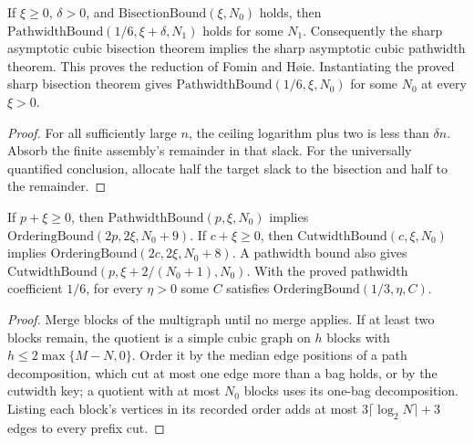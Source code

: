 \begin{theorem}
  \label{thm:lowerbounds-algebraic-bisection-pathwidth}
  \leanok
  If $\xi\ge 0$, $\delta>0$, and $\mathrm{BisectionBound}(\xi,N_0)$
  holds, then $\mathrm{PathwidthBound}(1/6,\xi+\delta,N_1)$ holds for some
  $N_1$. Consequently the sharp asymptotic cubic bisection theorem implies
  the sharp asymptotic cubic pathwidth theorem. This proves the reduction
  of Fomin and H{\o}ie. Instantiating the proved sharp bisection theorem
  gives $\mathrm{PathwidthBound}(1/6,\xi,N_0)$ for some $N_0$ at every
  $\xi>0$.
\end{theorem}
\begin{proof}
  \leanok
  For all sufficiently large $n$, the ceiling logarithm plus two is less
  than $\delta n$. Absorb the finite assembly's remainder in that slack.
  For the universally quantified conclusion, allocate half the target
  slack to the bisection and half to the remainder.
\end{proof}

\begin{theorem}
  \label{thm:lowerbounds-algebraic-ordering-bound}
  \leanok
  If $p+\xi\ge0$, then $\mathrm{PathwidthBound}(p,\xi,N_0)$ implies
  $\mathrm{OrderingBound}(2p,2\xi,N_0+9)$. If $c+\xi\ge0$, then
  $\mathrm{CutwidthBound}(c,\xi,N_0)$ implies
  $\mathrm{OrderingBound}(2c,2\xi,N_0+8)$. A pathwidth bound also gives
  $\mathrm{CutwidthBound}(p,\xi+2/(N_0+1),N_0)$. With the proved pathwidth
  coefficient $1/6$, for every $\eta>0$ some $C$ satisfies
  $\mathrm{OrderingBound}(1/3,\eta,C)$.
\end{theorem}
\begin{proof}
  \leanok
  Merge blocks of the multigraph until no merge applies. If at least two
  blocks remain, the quotient is a simple cubic graph on $h$ blocks with
  $h\le 2\max\{M-N,0\}$. Order it by the median edge positions of a path
  decomposition, which cut at most one edge more than a bag holds, or by
  the cutwidth key; a quotient with at most $N_0$ blocks uses its one-bag
  decomposition. Listing each block's vertices in its recorded order adds
  at most $3\lceil\log_2 N\rceil+3$ edges to every prefix cut.
\end{proof}

